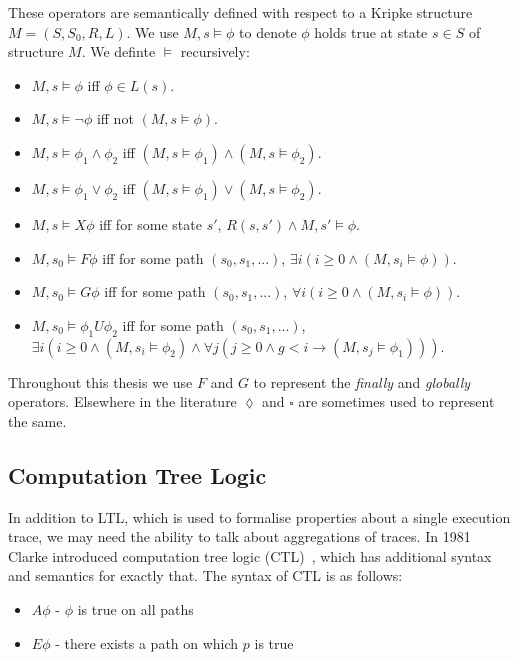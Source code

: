 These operators are semantically defined with respect to a Kripke structure $M
= (S, S_0, R, L)$. We use $M, s \models \phi$ to denote $\phi$ holds true at
state $s \in S$ of structure $M$. We definte $\models$ recursively:

\begin{itemize}
    \item $M, s \models \phi$ iff $\phi \in L(s)$.
    \item $M, s \models \lnot\phi$ iff not $(M, s \models \phi)$.
    \item $M, s \models \phi_1 \land \phi_2$ iff $(M, s \models \phi_1) \land (M, s \models \phi_2)$.
    \item $M, s \models \phi_1 \lor \phi_2$ iff $(M, s \models \phi_1) \lor (M, s \models \phi_2)$.
    \item $M, s \models X\phi$ iff for some state $s'$, $R(s, s') \land M, s' \models \phi$.
    \item $M, s_0 \models F\phi$ iff for some path $(s_0, s_1, ...)$, $\exists i (i \geq 0 \land (M, s_i \models \phi))$.
    \item $M, s_0 \models G\phi$ iff for some path $(s_0, s_1, ...)$, $\forall i (i \geq 0 \land (M, s_i \models \phi))$.
    \item $M, s_0 \models \phi_1 U \phi_2$ iff for some path $(s_0, s_1, ...)$, $\exists i (i \geq 0 \land (M, s_i \models \phi_2) \land \forall j (j \geq 0 \land g < i \to (M, s_j \models \phi_1)))$.
\end{itemize}

Throughout this thesis we use $F$ and $G$ to represent the \emph{finally} and \emph{globally} operators. Elsewhere in the literature $\lozenge$ and $\square$ are sometimes used to represent the same.  

\subsection{Computation Tree Logic}

In addition to LTL, which is used to formalise properties about a single
execution trace, we may need the ability to talk about aggregations of traces.
In 1981 Clarke introduced computation tree logic (CTL)~\cite{Clarke81}, which
has additional syntax and semantics for exactly that. The syntax of CTL is as
follows:

\begin{itemize}
    \item $A\phi$ - $\phi$ is true on all paths
    \item $E\phi$ - there exists a path on which $p$ is true
\end{itemize}

